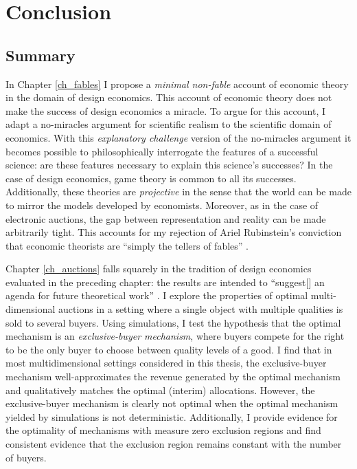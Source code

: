 \chapter{Conclusion}

\section{Summary}

In Chapter \ref{ch_fables} I propose a \textit{minimal non-fable} account of economic theory in the domain of design economics. This account of economic theory does not make the success of design economics a miracle. To argue for this account, I adapt a no-miracles argument for scientific realism to the scientific domain of economics. With this \textit{explanatory challenge} version of the no-miracles argument it becomes possible to philosophically interrogate the features of a successful science: are these features necessary to explain this science's successes? In the case of design economics, game theory is common to all its successes. Additionally, these theories are \textit{projective} \autocite{guala2001} in the sense that the world can be made to mirror the models developed by economists. Moreover, as in the case of electronic auctions, the gap between representation and reality can be made arbitrarily tight. This accounts for my rejection of Ariel Rubinstein's conviction that economic theorists are ``simply the tellers of fables'' \autocite[882]{rubinstein2006}.

Chapter \ref{ch_auctions} falls squarely in the tradition of design economics evaluated in the preceding chapter: the results are intended to ``suggest[] an agenda for future theoretical work'' \autocite[p1363]{roth2002}. I explore the properties of optimal multi-dimensional auctions in a setting where a single object with multiple qualities is sold to several buyers. Using simulations, I test the hypothesis that the optimal mechanism is an \textit{exclusive-buyer mechanism}, where buyers compete for the right to be the only buyer to choose between quality levels of a good. I find that in most multidimensional settings considered in this thesis, the exclusive-buyer mechanism well-approximates the revenue generated by the optimal mechanism and qualitatively matches the optimal (interim) allocations. However, the exclusive-buyer mechanism is clearly not optimal when the optimal mechanism yielded by simulations is not deterministic. Additionally, I provide evidence for the optimality of mechanisms with measure zero exclusion regions and find consistent evidence that the exclusion region remains constant with the number of buyers.

